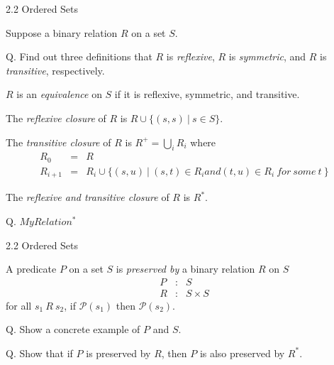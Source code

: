 \documentclass[table]{beamer}
\begin{document}
\begin{frame}[t]{2.2 Ordered Sets} %

Suppose a binary relation $R$ on a set $S$. 

\vspace{10pt}

Q. Find out three definitions that $R$ is {\it reflexive}, $R$ is {\it symmetric}, and $R$ is {\it transitive}, respectively. 

\vspace{10pt}

$R$ is an {\it equivalence} on $S$ if it is reflexive, symmetric, and transitive. 

\vspace{10pt}

The {\it reflexive closure} of $R$ is $R \cup \{ (s,s) \ | \ s \in S \}$.

\vspace{10pt}

The {\it transitive closure} of $R$ is $R^+= \bigcup_i R_i$ where 
\begin{eqnarray*}
R_0 & = & R \\
R_{i+1} & = & R_i \cup \{ (s,u) \ | \ (s,t) \in R_i and (t,u) \in R_i \ for \ some \ t \ \}
\end{eqnarray*}


The {\it reflexive and transitive closure} of $R$ is $R^*$.

\vspace{10pt}

Q. $MyRelation^*$

\end{frame}

\begin{frame}[t]{2.2 Ordered Sets} \vspace{10pt}

A predicate $P$ on a set $S$ is {\it \color{red} preserved by} a binary relation $R$ on $S$
\begin{eqnarray*}
P & : & S\\
R & : & S \times S 
\end{eqnarray*}
for all $s_1 \ R \ s_2$, if $\mathcal{P}(s_1)$ then $\mathcal{P}(s_2)$.
\vspace{10pt}

Q. Show a concrete example of $P$ and $S$. 

\vspace{10pt}

Q. Show that if $P$ is preserved by $R$, then $P$ is also preserved by $R^*$. 

\end{frame}
\end{document}
